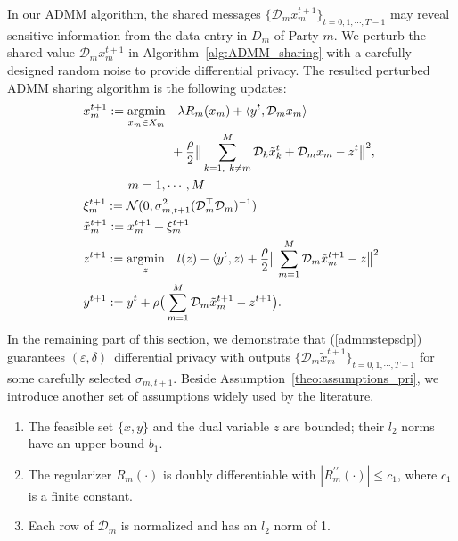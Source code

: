 In our ADMM algorithm, the shared messages $\{\mathcal{D}_mx_m^{t+1}\}_{t=0,1,\cdots,T-1}$ may reveal sensitive information from the data entry in $D_m$ of Party $m$. We perturb the shared value $\mathcal{D}_mx^{t+1}_m$ in Algorithm~\ref{alg:ADMM_sharing} with a carefully designed random noise to provide differential privacy. The resulted perturbed ADMM sharing algorithm is the following updates:
\begin{align}
  &x_{m}^{t+1}:=\underset{x_m\in X_m}{\text{argmin}}\quad\lambda R_m(x_m) + \langle y^t, \mathcal{D}_mx_m\rangle\nonumber\\
  &\quad\quad\quad\quad\quad\quad\quad + \frac{\rho}{2}\big\|\sum_{\substack{k=1,~k\neq m}}^{M}\mathcal{D}_k\tilde{x}_k^{t} + \mathcal{D}_mx_m - z^t\big\|^2, \nonumber\\&\hspace*{36pt} m=1,\cdots,M
  \nonumber\\
  &\xi_m^{t+1}:=\mathcal{N}(0,\sigma_{m,t+1}^2
  (\mathcal{D}_m^\top\mathcal{D}_m)^{-1}
  )\nonumber\\
  &\tilde{x}_m^{t+1}:= x_m^{t+1}+\xi_m^{t+1}\label{admmstepsdp}\\
  &z^{t+1}:=\underset{z}{\text{argmin}}\quad l(z)  - \langle y^t, z \rangle + \frac{\rho}{2} \big\|\sum_{m=1}^{M}\mathcal{D}_m\tilde{x}_m^{t+1} - z\big\|^2\nonumber\\
&y^{t+1}:=y^t + \rho\big(\sum_{m=1}^{M}\mathcal{D}_m\tilde{x}_m^{t+1} - z^{t+1}\big). \nonumber
\end{align}
In the remaining part of this section, we demonstrate that (\ref{admmstepsdp}) guarantees $(\varepsilon, \delta)$~differential privacy with outputs $\{\mathcal{D}_m\tilde{x}_m^{t+1}\}_{t=0,1,\cdots,T-1}$ for some carefully selected $\sigma_{m,t+1}$. Beside Assumption~\ref{theo:assumptions_pri}, we introduce another set of assumptions widely used by the literature.
\begin{assume}\label{theo:assumptions_pri_added}
  \begin{enumerate}
    \item The feasible set $\{x,y\}$ and the dual variable $z$ are bounded; their $l_2$ norms have an upper bound $b_1$.\label{item:assum_5_pri}
    \item The regularizer $R_m(\cdot)$ is doubly differentiable
    with $|R_m^{\prime\prime}(\cdot)|\leq c_1$, where $c_1$ is a finite constant.\label{item:assum_6_pri}
    \item Each row of $\mathcal{D}_m$ is normalized and has an $l_2$ norm of 1.\label{item:assum_7_pri}
  \end{enumerate}
\end{assume}
